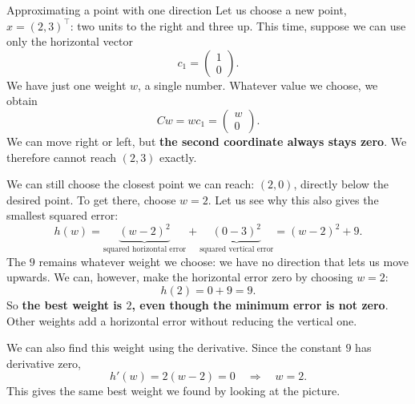 \documentclass[a4paper,12pt,oneside]{report}
\begin{document}
\begin{framedexample}{Approximating a point with one direction}
Let us choose a new point, $x=(2,3)^\top$: two units to the right
and three up. This time, suppose we can use only the horizontal vector
\[
  c_1=\begin{pmatrix}1\\0\end{pmatrix}.
\]
We have just one weight $w$, a single number. Whatever value we choose,
we obtain
\[
  Cw=wc_1=\begin{pmatrix}w\\0\end{pmatrix}.
\]
We can move right or left, but \textbf{the second coordinate always
stays zero}. We therefore cannot reach $(2,3)$ exactly.

\begin{center}
\end{center}

We can still choose the closest point we can reach: $(2,0)$,
directly below the desired point. To get there, choose $w=2$.
Let us see why this also gives the smallest squared error:
\[
  h(w)=\underbrace{(w-2)^2}_{\text{squared horizontal error}}
       +\underbrace{(0-3)^2}_{\text{squared vertical error}}
      =(w-2)^2+9.
\]
The $9$ remains whatever weight we choose: we have no direction
that lets us move upwards. We can, however, make the horizontal
error zero by choosing $w=2$:
\[
  h(2)=0+9=9.
\]
So \textbf{the best weight is $2$, even though the minimum error is
not zero}. Other weights add a horizontal error without reducing
the vertical one.

We can also find this weight using the derivative. Since the
constant $9$ has derivative zero,
\[
  h'(w)=2(w-2)=0
  \quad\Longrightarrow\quad w=2.
\]
This gives the same best weight we found by looking at the picture.
\end{framedexample}
\end{document}
